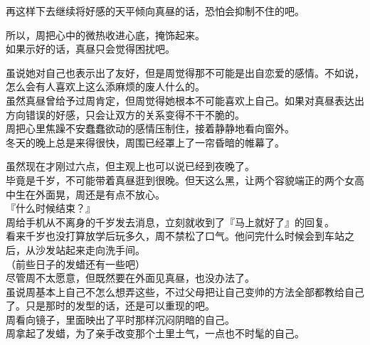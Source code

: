 再这样下去继续将好感的天平倾向真昼的话，恐怕会抑制不住的吧。

所以，周把心中的微热收进心底，掩饰起来。\\

如果示好的话，真昼只会觉得困扰吧。

虽说她对自己也表示出了友好，但是周觉得那不可能是出自恋爱的感情。不如说，怎么会有人喜欢上这么添麻烦的废人什么的。\\

虽然真昼曾给予过周肯定，但周觉得她根本不可能喜欢上自己。如果对真昼表达出方向错误的好感，只会让双方的关系变得不干不脆的。\\

周把心里焦躁不安蠢蠢欲动的感情压制住，接着静静地看向窗外。\\

冬天的晚上总是来得很快，周围已经罩上了一帘昏暗的帷幕了。

虽然现在才刚过六点，但主观上也可以说已经到夜晚了。\\

毕竟是千岁，不可能带着真昼逛到很晚。但天这么黑，让两个容貌端正的两个女高中生在外面晃，周还是有点不放心。\\

『什么时候结束？』\\

周给手机从不离身的千岁发去消息，立刻就收到了『马上就好了』的回复。\\

看来千岁也没打算放学后玩多久，周不禁松了口气。他问完什么时候会到车站之后，从沙发站起来走向洗手间。\\

（前些日子的发蜡还有一些吧）\\

尽管周不太愿意，但既然要在外面见真昼，也没办法了。\\

虽说周基本上自己不怎么想弄这些，不过父母把让自己变帅的方法全部都教给自己了。只是那时的发型的话，还是可以重现的吧。\\

周看向镜子，里面映出了平时那样沉闷阴暗的自己。\\

周拿起了发蜡，为了亲手改变那个土里土气，一点也不时髦的自己。
